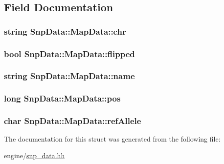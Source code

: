 \subsection{Field Documentation}
\hypertarget{structSnpData_1_1MapData_a722c6b2849f9ce664afb172617fb4cbd}{
\subsubsection[{chr}]{\setlength{\rightskip}{0pt plus 5cm}string {\bf SnpData::MapData::chr}}}
\label{structSnpData_1_1MapData_a722c6b2849f9ce664afb172617fb4cbd}
\hypertarget{structSnpData_1_1MapData_aea06cd63b1801d2f4633f48fa42510b1}{
\subsubsection[{flipped}]{\setlength{\rightskip}{0pt plus 5cm}bool {\bf SnpData::MapData::flipped}}}
\label{structSnpData_1_1MapData_aea06cd63b1801d2f4633f48fa42510b1}
\hypertarget{structSnpData_1_1MapData_a75420d29bffd19b97db769f345f4b4ae}{
\subsubsection[{name}]{\setlength{\rightskip}{0pt plus 5cm}string {\bf SnpData::MapData::name}}}
\label{structSnpData_1_1MapData_a75420d29bffd19b97db769f345f4b4ae}
\hypertarget{structSnpData_1_1MapData_ac44edc4ea3bb6b526aa082eb19589f5b}{
\subsubsection[{pos}]{\setlength{\rightskip}{0pt plus 5cm}long {\bf SnpData::MapData::pos}}}
\label{structSnpData_1_1MapData_ac44edc4ea3bb6b526aa082eb19589f5b}
\hypertarget{structSnpData_1_1MapData_af6f9c3ab44d69c3df9230d7076929a54}{
\subsubsection[{refAllele}]{\setlength{\rightskip}{0pt plus 5cm}char {\bf SnpData::MapData::refAllele}}}
\label{structSnpData_1_1MapData_af6f9c3ab44d69c3df9230d7076929a54}


The documentation for this struct was generated from the following file:\begin{DoxyCompactItemize}
\item 
engine/\hyperlink{snp__data_8hh}{snp\_\-data.hh}\end{DoxyCompactItemize}
